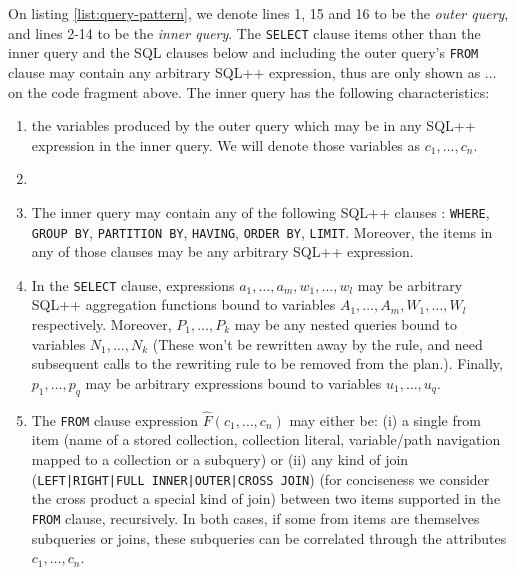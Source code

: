On listing \ref{list:query-pattern}, we denote lines 1, 15 and 16 to be the \emph{outer query}, and lines 2-14 to be the \emph{inner query}. The \texttt{SELECT} clause items other than the inner query and the SQL clauses below and including the outer query's \texttt{FROM} clause may contain any arbitrary SQL++ expression, thus are only shown as $\dots$ on the code fragment above. 
The inner query has the following characteristics:

\begin{enumerate}
\item the variables produced by the outer query which may be in any SQL++ expression in the inner query. We will denote those variables as $c_1, \dots, c_n$. 
\item {}
\item The inner query may contain any of the following SQL++ clauses : \texttt{WHERE}, \texttt{GROUP BY}, \texttt{PARTITION BY}, \texttt{HAVING}, \texttt{ORDER BY}, \texttt{LIMIT}. Moreover, the items in any of those clauses may be any arbitrary SQL++ expression. 
\item In the \texttt{SELECT} clause, expressions $a_1, \dots, a_m, w_1, \dots, w_l$ may be arbitrary SQL++ aggregation functions bound to variables $A_1, \dots, A_m, W_1, \dots, W_l$ respectively. Moreover, $P_1, \dots, P_k$ may be any nested queries bound to variables $N_1, \dots, N_k$ (These won't be rewritten away by the rule, and need subsequent calls to the rewriting rule to be removed from the plan.). Finally, $p_1, \dots, p_q$ may be arbitrary expressions bound to variables $u_1, \dots, u_q$.
\item The \texttt{FROM} clause expression $\hat{F}(c_1, \dots, c_n)$ may either be: (i) a single from item (name of a stored collection, collection literal, variable/path navigation mapped to a collection or a subquery) or (ii) any kind of join (\texttt{LEFT|RIGHT|FULL INNER|OUTER|CROSS JOIN}) (for conciseness we consider the cross product a special kind of join) between two items supported in the \texttt{FROM} clause, recursively. In both cases, if some from items are themselves subqueries or joins, these subqueries can be correlated through the attributes $c_1, \dots, c_n$. 
\end{enumerate}


